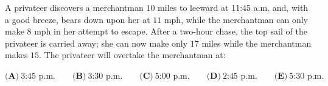 A privateer discovers a merchantman $10$ miles to leeward at 11:45 a.m. and, with a good breeze, bears down upon her at $11$ mph, while the merchantman can only make $8$ mph in her attempt to escape. After a two-hour chase, the top sail of the privateer is carried away; she can now make only $17$ miles while the merchantman makes $15$. The privateer will overtake the merchantman at:

$\textbf{(A)}\ 3\text{:}45\text{ p.m.} \qquad \textbf{(B)}\ 3\text{:}30\text{ p.m.} \qquad \textbf{(C)}\ 5\text{:}00\text{ p.m.} \qquad \textbf{(D)}\ 2\text{:}45\text{ p.m.} \qquad \textbf{(E)}\ 5\text{:}30\text{ p.m.}$
